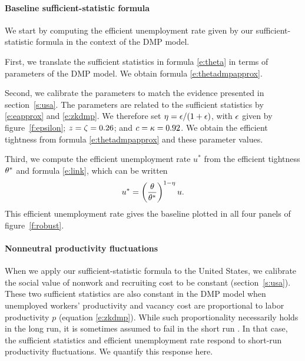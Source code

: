 \documentclass[letterpaper,12pt,leqno]{article}
\begin{document}
\paragraph{Baseline sufficient-statistic formula} We start by computing the efficient unemployment rate given by our sufficient-statistic formula in the context of the DMP model. 

First, we translate the sufficient statistics in formula \eqref{e:theta} in terms of parameters of the DMP model. We obtain formula \eqref{e:thetadmpapprox}.

Second, we calibrate the parameters to match the evidence presented in section~\ref{s:usa}. The parameters are related to the sufficient statistics by \eqref{e:eapprox} and \eqref{e:zkdmp}. We therefore set $\eta = \epsilon/(1+\epsilon)$, with $\epsilon$ given by figure~\ref{f:epsilon}; $z = \zeta = 0.26$; and $c = \kappa = 0.92$. We obtain the efficient tightness from formula \eqref{e:thetadmpapprox} and these parameter values.

Third, we compute the efficient unemployment rate $u^*$ from the efficient tightness $\theta^*$ and formula \eqref{e:link}, which can be written 
\begin{equation}
u^* = \left( \frac{\theta}{\theta^*} \right)^{1-\eta} u.
\label{e:linkdmp}\end{equation}
This efficient unemployment rate gives the baseline plotted in all four panels of figure~\ref{f:robust}.

\paragraph{Nonneutral productivity fluctuations} When we apply our sufficient-statistic formula to the United States, we calibrate the social value of nonwork and recruiting cost to be constant (section~\ref{s:usa}). These two sufficient statistics are also constant in the DMP model when unemployed workers' productivity and vacancy cost are proportional to labor productivity $p$ (equation \eqref{e:zkdmp}). While such proportionality necessarily holds in the long run, it is sometimes assumed to fail in the short run . In that case, the sufficient statistics and efficient unemployment rate respond to short-run productivity fluctuations. We quantify this response here.
\end{document}
